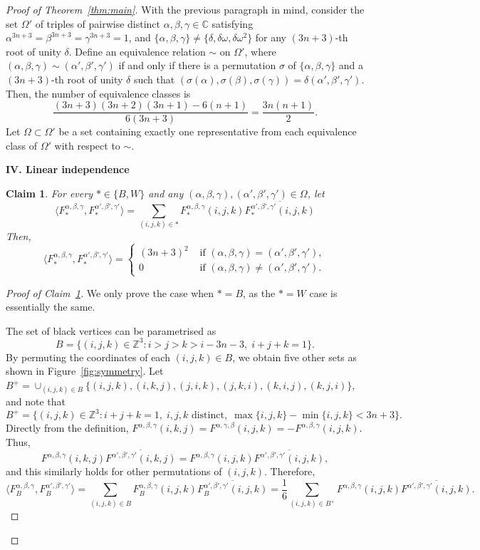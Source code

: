 \documentclass{article}
\newtheorem{claim}[theorem]{Claim}
\begin{document}
\begin{proof}[Proof of Theorem~\ref{thm:main}]
With the previous paragraph in mind, consider the set $\Omega'$ of triples of pairwise distinct $\alpha,\beta,\gamma\in\mathbb{C}$ satisfying $\alpha^{3n+3}=\beta^{3n+3}=\gamma^{3n+3}=1$, and $\{\alpha,\beta,\gamma\}\not=\{\delta,\delta\omega,\delta\omega^2\}$ for any $(3n+3)$-th root of unity $\delta$. Define an equivalence relation $\sim$ on $\Omega'$, where $(\alpha,\beta,\gamma)\sim(\alpha',\beta',\gamma')$ if and only if there is a permutation $\sigma$ of $\{\alpha,\beta,\gamma\}$ and a $(3n+3)$-th root of unity $\delta$ such that $(\sigma(\alpha),\sigma(\beta),\sigma(\gamma))=\delta(\alpha',\beta',\gamma')$. Then, the number of equivalence classes is 
\[\frac{(3n+3)(3n+2)(3n+1)-6(n+1)}{6(3n+3)}=\frac{3n(n+1)}2.\]
Let $\Omega\subset \Omega'$ be a set containing exactly one representative from each equivalence class of $\Omega'$ with respect to $\sim$.

\medskip
\textbf{IV. Linear independence}
\begin{claim}\label{claim:indep}
For every $\ast\in\{B,W\}$ and any $(\alpha,\beta,\gamma),(\alpha',\beta',\gamma')\in \Omega$, let
\[\langle F^{\alpha,\beta,\gamma}_{\ast},F^{\alpha',\beta',\gamma'}_{\ast}\rangle=\sum_{(i,j,k)\in\ast}F^{\alpha,\beta,\gamma}_{\ast}(i,j,k)\overline{F^{\alpha',\beta',\gamma'}_{\ast}(i,j,k)}\]%
Then,
\[\langle F^{\alpha,\beta,\gamma}_{\ast},F^{\alpha',\beta',\gamma'}_{\ast}\rangle=
\begin{cases}
(3n+3)^2 & \text{ if }(\alpha,\beta,\gamma)=(\alpha',\beta',\gamma'),\\
0 & \text{ if }(\alpha,\beta,\gamma)\not=(\alpha',\beta',\gamma').    
\end{cases}\]
\end{claim}
\begin{proof}[Proof of Claim~\ref{claim:indep}]
We only prove the case when $\ast=B$, as the $\ast=W$ case is essentially the same. 

The set of black vertices can be parametrised as
\[B=\{(i,j,k)\in\mathbb{Z}^3:i>j>k>i-3n-3,\;i+j+k=1\}.\]
By permuting the coordinates of each $(i,j,k)\in B$, we obtain five other sets as shown in Figure~\ref{fig:symmetry}. Let $B^+=\cup_{(i,j,k)\in B}\{(i,j,k),(i,k,j),(j,i,k),(j,k,i),(k,i,j),(k,j,i)\}$, and note that 
\[B^+=\{(i,j,k)\in\mathbb{Z}^3:i+j+k=1,\;i,j,k\text{ distinct},\;\max\{i,j,k\}-\min\{i,j,k\}<3n+3\}.\]
Directly from the definition, $F^{\alpha,\beta,\gamma}(i,k,j)=F^{\alpha,\gamma,\beta}(i,j,k)=-F^{\alpha,\beta,\gamma}(i,j,k)$. Thus, \[F^{\alpha,\beta,\gamma}(i,k,j)\overline{F^{\alpha',\beta',\gamma'}(i,k,j)}=F^{\alpha,\beta,\gamma}(i,j,k)\overline{F^{\alpha',\beta',\gamma'}(i,j,k)},\]
and this similarly holds for other permutations of $(i,j,k)$. Therefore, 
\[\langle F^{\alpha,\beta,\gamma}_B,F^{\alpha',\beta',\gamma'}_B\rangle=\sum_{(i,j,k)\in B}F^{\alpha,\beta,\gamma}_B(i,j,k)\overline{F^{\alpha',\beta',\gamma'}_B(i,j,k)}=\frac16\sum_{(i,j,k)\in B^+}F^{\alpha,\beta,\gamma}(i,j,k)\overline{F^{\alpha',\beta',\gamma'}(i,j,k)}.\]


\end{proof}
\end{proof}
\end{document}
